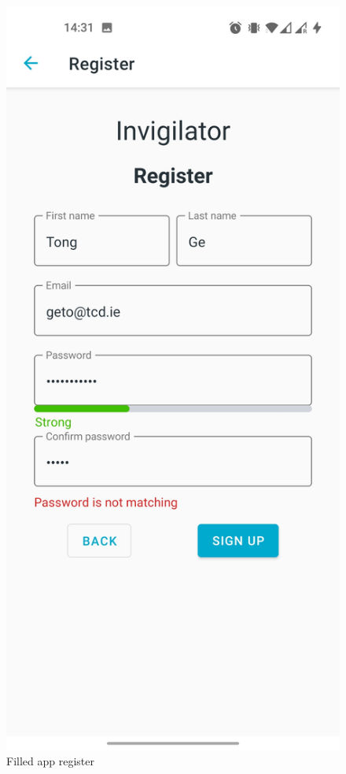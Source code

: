 \begin{minipage}{.5\textwidth}
\begin{figure}[H]
    \centering
    \includegraphics[width=\textwidth]{appendix/imgs/app-register-filled.jpg}
    \caption{Filled app register}
    \label{fig:app-register-filled}
\end{figure}
\end{minipage}

